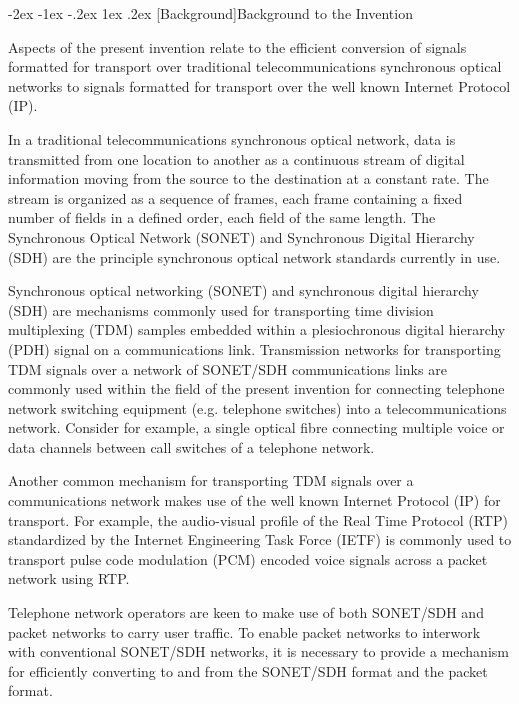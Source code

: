 \documentclass[letterpaper,final,notitlepage,twocolumn,10pt,twoside]{article}
\makeatletter
\let\large = \normalsize
\let\normalsize = \small
\let\small = \footnotesize
\let\footnotesize = \scriptsize
\let\scriptsize = \tiny
\renewcommand\section{\@startsection {section}{1}{\z@}%
                                   {-2ex \@plus -1ex \@minus -.2ex}%
                                   {1ex \@plus .2ex}%
                                   {\normalfont\large\bfseries}}
\makeatother
\begin{document}
\section[Background]{Background to the Invention}

Aspects of the present invention relate to the efficient conversion of signals
formatted for transport over traditional telecommunications synchronous
optical networks to signals formatted for transport over the well known
Internet Protocol (IP). \nocite{rfc791}

In a traditional telecommunications synchronous optical network, data is
transmitted from one location to another as a continuous stream of digital
information moving from the source to the destination at a constant rate.  The
stream is organized as a sequence of frames, each frame containing a fixed
number of fields in a defined order, each field of the same length.  The
Synchronous Optical Network (SONET) and Synchronous Digital Hierarchy (SDH)
are the principle synchronous optical network standards currently in use.

Synchronous optical networking (SONET) and synchronous digital hierarchy (SDH)
are mechanisms commonly used for transporting time division multiplexing (TDM)
samples embedded within a plesiochronous digital hierarchy (PDH) signal on
a communications link.  Transmission networks for transporting TDM signals
over a network of SONET/SDH communications links are commonly used within the
field of the present invention for connecting telephone network switching
equipment (e.g. telephone switches) into a telecommunications network.
Consider for example, a single optical fibre connecting multiple voice or data
channels between call switches of a telephone network.

Another common mechanism for transporting TDM signals over a communications
network makes use of the well known Internet Protocol (IP) for transport.  For
example, the audio-visual profile of the Real Time Protocol (RTP) standardized
by the Internet Engineering Task Force (IETF) is commonly used to transport
pulse code modulation (PCM) encoded voice signals across a packet network
using RTP. \nocite{rfc1889}

Telephone network operators are keen to make use of both SONET/SDH and packet
networks to carry user traffic.  To enable packet networks to interwork with
conventional SONET/SDH networks, it is necessary to provide a mechanism for
efficiently converting to and from the SONET/SDH format and the packet format.
\end{document}
